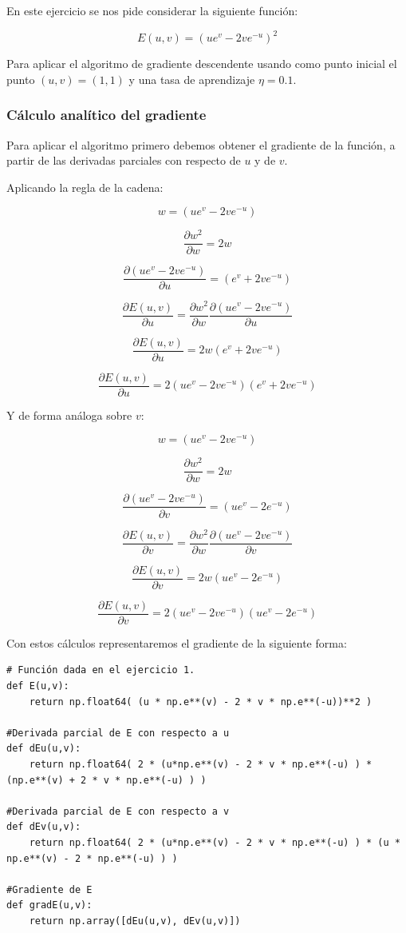 \documentclass[12pt, spanish]{article}
\begin{document}
En este ejercicio se nos pide considerar la siguiente función:

$$ E(u,v) = (ue^v - 2ve^{-u})^2 $$

Para aplicar el algoritmo de gradiente descendente usando como punto inicial el punto $ (u,v) = (1, 1) $ y una tasa de aprendizaje $\eta = 0.1 $. 

\subsubsection{Cálculo analítico del gradiente}

Para aplicar el algoritmo primero debemos obtener el gradiente de la función, a partir de las derivadas parciales con respecto de $u$ y de $v$.

Aplicando la regla de la cadena:

$$ w =  (ue^v - 2ve^{-u}) $$

$$\frac{\partial w^2}{\partial w} = 2w $$


$$\frac{\partial  (ue^v - 2ve^{-u})}{\partial u} = (e^v + 2ve^{-u}) $$

$$\frac{\partial  E(u,v)}{\partial u} =  \frac{\partial w^2}{\partial w}  \frac{\partial  (ue^v - 2ve^{-u})}{\partial u}   $$

$$\frac{\partial  E(u,v)}{\partial u} =    2w (e^v + 2ve^{-u})  $$

$$\frac{\partial  E(u,v)}{\partial u} =    2  (ue^v - 2ve^{-u}) (e^v + 2ve^{-u})  $$

\newpage

Y de forma análoga sobre $v$:

$$ w =  (ue^v - 2ve^{-u}) $$

$$\frac{\partial w^2}{\partial w} = 2w $$


$$\frac{\partial  (ue^v - 2ve^{-u})}{\partial v} = (ue^v - 2e^{-u}) $$

$$\frac{\partial  E(u,v)}{\partial v} =  \frac{\partial w^2}{\partial w}  \frac{\partial  (ue^v - 2ve^{-u})}{\partial v}   $$

$$\frac{\partial  E(u,v)}{\partial v} =    2w (ue^v - 2e^{-u})  $$

$$\frac{\partial  E(u,v)}{\partial v} =    2  (ue^v - 2ve^{-u}) (ue^v - 2e^{-u})  $$



Con estos cálculos representaremos el gradiente de la siguiente forma:

\begin{lstlisting}
# Función dada en el ejercicio 1.
def E(u,v):
	return np.float64( (u * np.e**(v) - 2 * v * np.e**(-u))**2 ) 

#Derivada parcial de E con respecto a u
def dEu(u,v):
    return np.float64( 2 * (u*np.e**(v) - 2 * v * np.e**(-u) ) * (np.e**(v) + 2 * v * np.e**(-u) ) )

#Derivada parcial de E con respecto a v
def dEv(u,v):
    return np.float64( 2 * (u*np.e**(v) - 2 * v * np.e**(-u) ) * (u * np.e**(v) - 2 * np.e**(-u) ) )

#Gradiente de E
def gradE(u,v):
    return np.array([dEu(u,v), dEv(u,v)])


\end{lstlisting}
\end{document}
